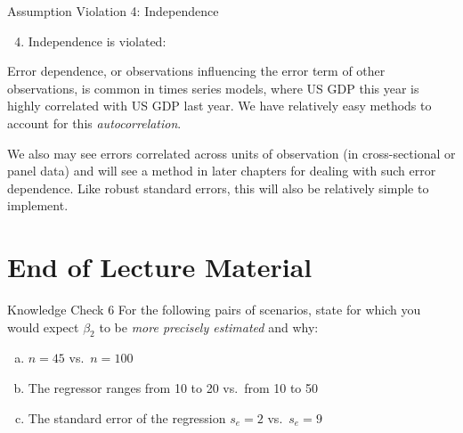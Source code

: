 \documentclass[
  ignorenonframetext,
  english,
]{beamer}
\providecommand{\tightlist}{%
  \setlength{\itemsep}{0pt}\setlength{\parskip}{0pt}}
\begin{document}
\begin{frame}{Assumption Violation 4: Independence}
\protect{}\label{assumption-violation-4-independence}
\begin{enumerate}
\setcounter{enumi}{3}
\tightlist
\item
  Independence is violated:
\end{enumerate}

Error dependence, or observations influencing the error term of other
observations, is common in times series models, where US GDP this year
is highly correlated with US GDP last year. We have relatively easy
methods to account for this \emph{autocorrelation}.

We also may see errors correlated across units of observation (in
cross-sectional or panel data) and will see a method in later chapters
for dealing with such error dependence. Like robust standard errors,
this will also be relatively simple to implement.
\end{frame}

\section{End of Lecture Material}\label{end-of-lecture-material}

\begin{frame}{Knowledge Check 6}
\protect{}\label{knowledge-check-6}
For the following pairs of scenarios, state for which you would expect
\(\beta_2\) to be \emph{more precisely estimated} and why:

\begin{enumerate}
[a)]
\item
  \(n=45\) vs.~\(n=100\)
\item
  The regressor ranges from 10 to 20 vs.~from 10 to 50
\item
  The standard error of the regression \(s_e=2\) vs.~\(s_e=9\)
\end{enumerate}
\end{frame}
\end{document}

